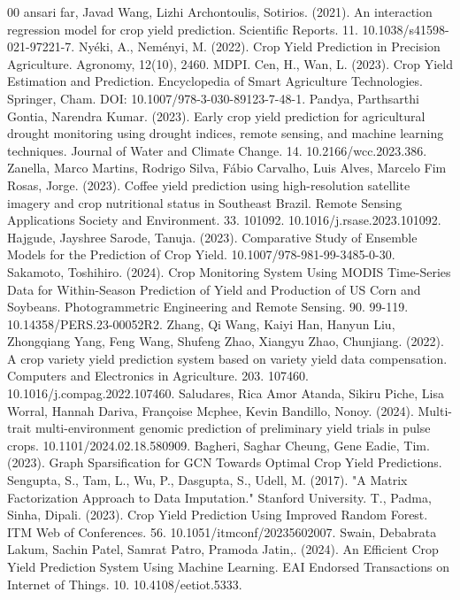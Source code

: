\documentclass[conference]{IEEEtran}
\begin{document}
\begin{thebibliography}{00}
 ansari far, Javad Wang, Lizhi Archontoulis, Sotirios. (2021). An interaction regression model for crop yield prediction. Scientific Reports. 11. 10.1038/s41598-021-97221-7. 
 Nyéki, A., Neményi, M. (2022). Crop Yield Prediction in Precision Agriculture. Agronomy, 12(10), 2460. MDPI.
 Cen, H., Wan, L. (2023). Crop Yield Estimation and Prediction. Encyclopedia of Smart Agriculture Technologies. Springer, Cham. DOI: 10.1007/978-3-030-89123-7-48-1.
 Pandya, Parthsarthi Gontia, Narendra Kumar. (2023). Early crop yield prediction for agricultural drought monitoring using drought indices, remote sensing, and machine learning techniques. Journal of Water and Climate Change. 14. 10.2166/wcc.2023.386. 
 Zanella, Marco Martins, Rodrigo Silva, Fábio Carvalho, Luis Alves, Marcelo Fim Rosas, Jorge. (2023). Coffee yield prediction using high-resolution satellite imagery and crop nutritional status in Southeast Brazil. Remote Sensing Applications Society and Environment. 33. 101092. 10.1016/j.rsase.2023.101092. 
 Hajgude, Jayshree Sarode, Tanuja. (2023). Comparative Study of Ensemble Models for the Prediction of Crop Yield. 10.1007/978-981-99-3485-0-30. 
 Sakamoto, Toshihiro. (2024). Crop Monitoring System Using MODIS Time-Series Data for Within-Season Prediction of Yield and Production of US Corn and Soybeans. Photogrammetric Engineering and Remote Sensing. 90. 99-119. 10.14358/PERS.23-00052R2. 
 Zhang, Qi Wang, Kaiyi Han, Hanyun Liu, Zhongqiang Yang, Feng Wang, Shufeng Zhao, Xiangyu Zhao, Chunjiang. (2022). A crop variety yield prediction system based on variety yield data compensation. Computers and Electronics in Agriculture. 203. 107460. 10.1016/j.compag.2022.107460. 
 Saludares, Rica Amor Atanda, Sikiru Piche, Lisa Worral, Hannah Dariva, Françoise Mcphee, Kevin Bandillo, Nonoy. (2024). Multi-trait multi-environment genomic prediction of preliminary yield trials in pulse crops. 10.1101/2024.02.18.580909. 
 Bagheri, Saghar Cheung, Gene Eadie, Tim. (2023). Graph Sparsification for GCN Towards Optimal Crop Yield Predictions.
 Sengupta, S., Tam, L., Wu, P., Dasgupta, S.,  Udell, M. (2017). "A Matrix Factorization Approach to Data Imputation." Stanford University.
 T., Padma, Sinha, Dipali. (2023). Crop Yield Prediction Using Improved Random Forest. ITM Web of Conferences. 56. 10.1051/itmconf/20235602007. 
 Swain, Debabrata Lakum, Sachin Patel, Samrat Patro, Pramoda Jatin,. (2024). An Efficient Crop Yield Prediction System Using Machine Learning. EAI Endorsed Transactions on Internet of Things. 10. 10.4108/eetiot.5333. 

\end{thebibliography}
\end{document}
